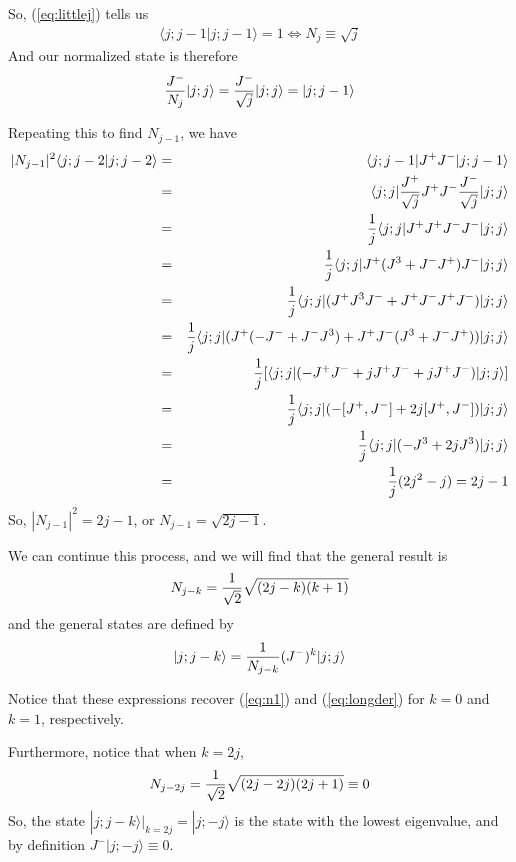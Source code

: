 \documentclass[12pt,epsf]{article}
\def\nolabel{\nonumber }
\def\nolabel{\nonumber }
\begin{document}
So, (\ref{eq:littlej}) tells us 
\begin{eqnarray}
\langle j;j-1|j;j-1\rangle = 1 \iff N_j \equiv \sqrt{j} \label{eq:n1}
\end{eqnarray}
And our normalized state is therefore 
\begin{eqnarray}
{J^- \over N_j} |j;j\rangle = {J^-\over \sqrt{j}}|j;j\rangle =
|j;j-1\rangle \nolabel 
\end{eqnarray}

Repeating this to find $N_{j-1}$, we have
\begin{eqnarray}
|N_{j-1}|^2\langle j;j-2|j;j-2\rangle &=& \langle
j;j-1|J^+J^-|j;j-1\rangle \nolabel \\
&=& \langle j;j|{J^+ \over \sqrt{j}}J^+J^-{J^- \over
\sqrt{j}}|j;j\rangle \nolabel \\
&=& {1\over j}\langle j;j|J^+J^+J^-J^-|j;j\rangle \nolabel \\
&=& {1\over j}\langle j;j|J^+(J^3+J^-J^+)J^-|j;j\rangle \nolabel \\
&=& {1\over j}\langle j;j|(J^+J^3J^-+J^+J^-J^+J^-)|j;j\rangle \nolabel
\\
&=& {1\over j}\langle
j;j|(J^+(-J^-+J^-J^3)+J^+J^-(J^3+J^-J^+))|j;j\rangle \nolabel \\
&=& {1\over j}[\langle j;j|(-J^+J^- + jJ^+J^-+jJ^+J^-)|j;j\rangle]
\nolabel \\
&=& {1\over j}\langle j;j|(-[J^+,J^-]+2j[J^+,J^-])|j;j\rangle \nolabel
\\
&=& {1\over j}\langle j;j|(-J^3+2jJ^3)|j;j\rangle \nolabel \\
&=& {1\over j} (2j^2 - j) = 2j-1 \label{eq:longder}
\end{eqnarray}
So, $|N_{j-1}|^2 = 2j-1$, or $N_{j-1} = \sqrt{2j-1}$.  

We can continue this process, and we will find that the general result
is 
\begin{eqnarray}
N_{j-k} = {1 \over \sqrt{2}}\sqrt{(2j-k)(k+1)} \label{eq:su3propconst}
\end{eqnarray}
and the general states are defined by 
\begin{eqnarray}
|j;j-k\rangle = {1 \over N_{j-k}}(J^-)^k|j;j\rangle \nolabel 
\end{eqnarray}

Notice that these expressions recover (\ref{eq:n1}) and
(\ref{eq:longder}) for $k=0$ and $k=1$, respectively.  

Furthermore, notice that when $k=2j$,
\begin{eqnarray}
N_{j-2j} = {1\over \sqrt{2}}\sqrt{(2j-2j)(2j+1)} \equiv 0 \nolabel 
\end{eqnarray}
So, the state $|j;j-k\rangle \big|_{k=2j} = |j;-j\rangle$ is the state
with the lowest eigenvalue, and by definition $J^-|j;-j\rangle \equiv
0$.  
\end{document}
